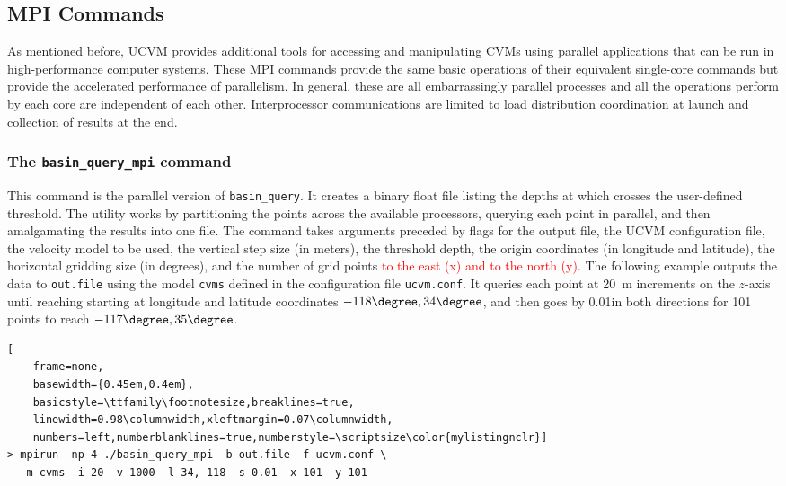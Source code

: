 \subsection{MPI Commands}

As mentioned before, UCVM provides additional tools for accessing and manipulating CVMs using parallel applications that can be run in high-performance computer systems. These MPI commands provide the same basic operations of their equivalent single-core commands but provide the accelerated performance of parallelism. In general, these are all embarrassingly parallel processes and all the operations perform by each core are independent of each other. Interprocessor communications are limited to load distribution coordination at launch and collection of results at the end.

\subsubsection{The \textup{\texttt{basin\_query\_mpi}} command}

This command is the parallel version of \texttt{basin\_query}. It creates a binary float file listing the depths at which \vs{} crosses the user-defined threshold. The utility works by partitioning the points across the available processors, querying each point in parallel, and then amalgamating the results into one file. The command takes arguments preceded by flags for the output file, the UCVM configuration file, the velocity model to be used, the vertical step size (in meters), the threshold depth, the origin coordinates (in longitude and latitude), the horizontal gridding size (in degrees), and the number of grid points \textcolor{red}{to the east (x) and to the north (y)}. The following example outputs the data to \texttt{out.file} using the model \texttt{cvms} defined in the configuration file \texttt{ucvm.conf}. It queries each point at 20~m increments on the $z$-axis until reaching  starting at longitude and latitude coordinates $-118\degree, 34\degree$, and then goes by 0.01\textdegree in both directions for 101 points to reach $-117\degree, 35\degree$.

\begin{lstlisting}[
	frame=none,
	basewidth={0.45em,0.4em},
	basicstyle=\ttfamily\footnotesize,breaklines=true,
	linewidth=0.98\columnwidth,xleftmargin=0.07\columnwidth,
	numbers=left,numberblanklines=true,numberstyle=\scriptsize\color{mylistingnclr}]
> mpirun -np 4 ./basin_query_mpi -b out.file -f ucvm.conf \
  -m cvms -i 20 -v 1000 -l 34,-118 -s 0.01 -x 101 -y 101
\end{lstlisting}

